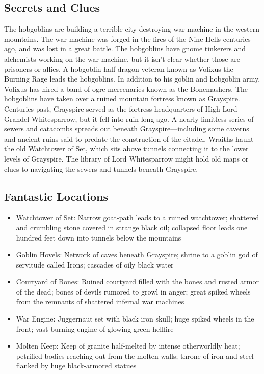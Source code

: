 \documentclass[10pt,a4paper,twoside,bg=print,twocolumn,openany,nodeprecatedcode]{dndbook}
\begin{document}
\subsection{Secrets and Clues}
The hobgoblins are building a terrible city-destroying war machine in the western mountains.
The war machine was forged in the fires of the Nine Hells centuries ago, and was lost in a great battle.
The hobgoblins have gnome tinkerers and alchemists working on the war machine, but it isn't clear whether those are prisoners or allies.
A hobgoblin half-dragon veteran known as Volixus the Burning Rage leads the hobgoblins.
In addition to his goblin and hobgoblin army, Volixus has hired a band of ogre mercenaries known as the Bonemashers.
The hobgoblins have taken over a ruined mountain fortress known as Grayspire.
Centuries past, Grayspire served as the fortress headquarters of High Lord Grandel Whitesparrow, but it fell into ruin long ago.
A nearly limitless series of sewers and catacombs spreads out beneath Grayspire—including some caverns and ancient ruins said to predate the construction of the citadel.
Wraiths haunt the old Watchtower of Set, which sits above tunnels connecting it to the lower levels of Grayspire.
The library of Lord Whitesparrow might hold old maps or clues to navigating the sewers and tunnels beneath Grayspire.
\subsection{Fantastic Locations}

\begin{itemize}
\item Watchtower of Set: Narrow goat-path leads to a ruined watchtower; shattered and crumbling stone covered in strange black oil; collapsed floor leads one hundred feet down into tunnels below the mountains
\item Goblin Hovels: Network of caves beneath Grayspire; shrine to a goblin god of servitude called Irons; cascades of oily black water
\item Courtyard of Bones: Ruined courtyard filled with the bones and rusted armor of the dead; bones of devils rumored to growl in anger; great spiked wheels from the remnants of shattered infernal war machines
\item War Engine: Juggernaut set with black iron skull; huge spiked wheels in the front; vast burning engine of glowing green hellfire
\item Molten Keep: Keep of granite half-melted by intense otherworldly heat; petrified bodies reaching out from the molten walls; throne of iron and steel flanked by huge black-armored statues
\end{itemize}
\end{document}
